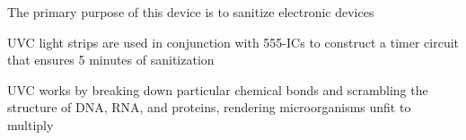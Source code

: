 \begin{cventries}
{\begin{cvitems}
        \item {The primary purpose of this device is to sanitize electronic devices}
        \item {UVC light strips are used in conjunction with 555-ICs to construct a timer circuit that ensures 5 minutes of sanitization}
        \item {UVC works by breaking down particular chemical bonds and scrambling the structure of DNA, RNA, and proteins, rendering microorganisms unfit to multiply}
        \url{}
      \end{cvitems}
    }
\end{cventries}
